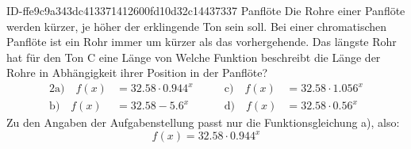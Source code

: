 \begin{exercise}
      {ID-ffe9c9a343dc413371412600fd10d32c14437337}
      {Panflöte}
  \ifproblem\problem
    Die Rohre einer Panflöte werden kürzer, je höher der
    erklingende Ton sein soll. Bei einer chromatischen
    Panflöte ist ein Rohr immer um  kürzer als
    das vorhergehende. Das längste Rohr hat für den Ton
    C eine Länge von  Welche Funktion
    beschreibt die Länge der Rohre in Abhängigkeit ihrer
    Position in der Panflöte?
    \begin{alignat*}{2}
      \text{a)}\quad f(x)&=\num{32.58}\cdot\num{0.944}^{x} & \qquad
      \text{c)}\quad f(x)&=\num{32.58}\cdot\num{1.056}^{x} \\
      \text{b)}\quad f(x)&=\num{32.58}-\num{5.6}^{x}       & \qquad
      \text{d)}\quad f(x)&=\num{32.58}\cdot\num{0.56}^{x}
    \end{alignat*}
  \fi
  \ifoutcome\outcome
    Zu den Angaben der Aufgabenstellung passt nur die
    Funktionsgleichung a), also:
    \begin{equation*}
      f(x)=\num{32.58}\cdot\num{0.944}^{x}
    \end{equation*}
  \fi
\end{exercise}
